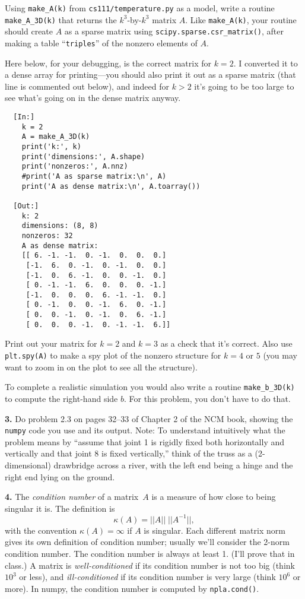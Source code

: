\documentclass[11pt]{article}
\begin{document}
Using {\tt make\_A(k)} from {\tt cs111/temperature.py} as a model, 
write a routine {\tt make\_A\_3D(k)} that returns the $k^3$-by-$k^3$ matrix $A$.
Like {\tt make\_A(k)}, your routine should create $A$ as a sparse matrix using
{\tt scipy.sparse.csr\_matrix()}, after making a table ``{\tt triples}'' of
the nonzero elements of $A$.

Here below, for your debugging, is the correct matrix for $k=2$.
I converted it to a dense array for printing---you should also
print it out as a sparse matrix (that line is commented out below), 
and indeed for $k>2$ it's going to be too
large to see what's going on in the dense matrix anyway.

\begin{verbatim}
  [In:]
    k = 2
    A = make_A_3D(k)
    print('k:', k)
    print('dimensions:', A.shape)
    print('nonzeros:', A.nnz)
    #print('A as sparse matrix:\n', A)
    print('A as dense matrix:\n', A.toarray())

  [Out:]
    k: 2
    dimensions: (8, 8)
    nonzeros: 32
    A as dense matrix:
    [[ 6. -1. -1.  0. -1.  0.  0.  0.]
     [-1.  6.  0. -1.  0. -1.  0.  0.]
     [-1.  0.  6. -1.  0.  0. -1.  0.]
     [ 0. -1. -1.  6.  0.  0.  0. -1.]
     [-1.  0.  0.  0.  6. -1. -1.  0.]
     [ 0. -1.  0.  0. -1.  6.  0. -1.]
     [ 0.  0. -1.  0. -1.  0.  6. -1.]
     [ 0.  0.  0. -1.  0. -1. -1.  6.]]
\end{verbatim}

Print out your matrix for $k=2$ and $k=3$ as a check that it's correct. 
Also use {\tt plt.spy(A)} to make a spy plot of the nonzero structure 
for $k=4$ or $5$ (you may want to zoom in on the plot to see all the structure).

To complete a realistic simulation you would also 
write a routine {\tt make\_b\_3D(k)} to compute the right-hand side $b$.
For this problem, you don't have to do that.

\par\bigskip
{\bf 3.}
Do problem 2.3 on pages 32--33 of Chapter 2 of the NCM book, 
showing the {\tt numpy} code you use and its output. 
Note: To understand intuitively what the problem means by 
``assume that joint 1 is rigidly fixed both horizontally and vertically 
and that joint 8 is fixed vertically,'' 
think of the truss as a (2-dimensional) drawbridge across a river, 
with the left end being a hinge and the right end lying on the ground.

\par\bigskip
{\bf 4.} The {\em condition number} of a matrix~$A$ is a measure of how close
to being singular it is. The definition is
$$\kappa(A) = ||A|| \; ||A^{-1}||,$$
with the convention $\kappa(A)=\infty$ if $A$ is singular. 
Each different matrix norm gives its own definition of condition number;
usually we'll consider the 2-norm condition number.
The condition number is always at least 1. 
(I'll prove that in class.)
A matrix is {\em well-conditioned} if its condition number is not too big 
(think $10^3$ or less), and {\em ill-conditioned} if its condition number is
very large (think $10^6$ or more).
In numpy, the condition number is computed by {\tt npla.cond()}.
\end{document}
